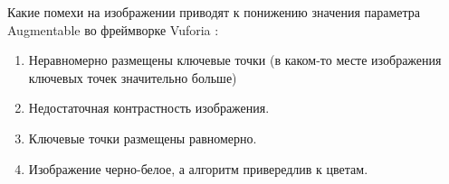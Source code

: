 
Какие помехи на изображении приводят к понижению значения параметра Augmentable во фреймворке Vuforia :

\begin{enumerate}
    \item Неравномерно размещены ключевые точки (в каком-то месте изображения ключевых точек значительно больше)
    \item Недостаточная контрастность изображения.
    \item Ключевые точки размещены равномерно.
    \item Изображение черно-белое, а алгоритм привередлив к цветам.
\end{enumerate}
